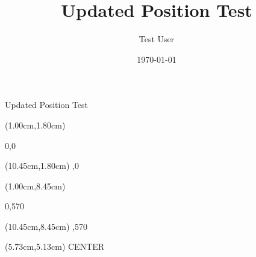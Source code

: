 \documentclass[aspectratio=169,xcolor=dvipsnames,professionalfonts]{beamer}
\title{Updated Position Test}
\author{Test User}
\date{\today}
\begin{document}
\begin{frame}
\titlepage
\end{frame}

\begin{frame}{Updated Position Test}

\begin{textblock*}{1.35cm}(1.00cm,1.80cm)
{\fontsize{12}{14.399999999999999}\selectfont\raggedright 0,0}
\end{textblock*}

\begin{textblock*}{1.35cm}(10.45cm,1.80cm)
{\fontsize{12}{14.399999999999999}\selectfont{},0}
\end{textblock*}

\begin{textblock*}{1.35cm}(1.00cm,8.45cm)
{\fontsize{12}{14.399999999999999}\selectfont\raggedright 0,570}
\end{textblock*}

\begin{textblock*}{1.35cm}(10.45cm,8.45cm)
{\fontsize{12}{14.399999999999999}\selectfont{},570}
\end{textblock*}

\begin{textblock*}{1.35cm}(5.73cm,5.13cm)
{\fontsize{14}{16.8}\selectfont\centering CENTER}
\end{textblock*}
\end{frame}
\end{document}
